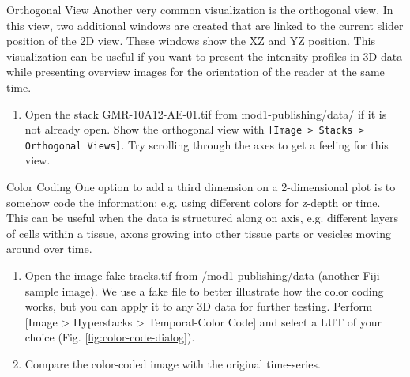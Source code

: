 \begin{taskbox}{Orthogonal View}
Another very common visualization is the orthogonal view. In this view, two additional windows are created that are linked to the current slider position of the 2D view. These windows show the XZ and YZ position. This visualization can be useful if you want to present the intensity profiles in 3D data while presenting overview images for the orientation of the reader at the same time.

\begin{enumerate}
	\item Open the stack GMR-10A12-AE-01.tif from mod1-publishing/data/ if it is not already open. Show the orthogonal view with \texttt{[Image > Stacks > Orthogonal Views]}. Try scrolling through the axes to get a feeling for this view.
\end{enumerate}

\end{taskbox}

\newpage
\begin{taskbox}{Color Coding}
One option to add a third dimension on a 2-dimensional plot is to somehow code the information; e.g. using different colors for z-depth or time. This can be useful when the data is structured along on axis, e.g. different layers of cells within a tissue, axons growing into other tissue parts or vesicles moving around over time.

\begin{enumerate}
	\item Open the image fake-tracks.tif from /mod1-publishing/data (another Fiji sample image). We use a fake file to better illustrate how the color coding works, but you can apply it to any 3D data for further testing. Perform [Image > Hyperstacks > Temporal-Color Code] and select a LUT of your choice (Fig. \ref{fig:color-code-dialog}).
	
	\begin{minipage}[t]{\linewidth}
		\begin{center}
		\medskip
		\label{fig:color-code-dialog}
		\end{center}
	\end{minipage}
	
	\item Compare the color-coded image with the original time-series.
\end{enumerate}

\end{taskbox}

